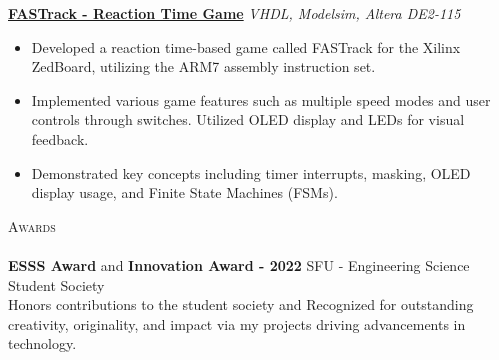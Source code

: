 \documentclass[a4paper]{article}
\newcommand{\lineunder} {
    \vspace*{-8pt} \\
    \hspace*{-18pt} \hrulefill \\
}
\newcommand{\header} [1] {
    {\hspace*{-18pt}\vspace*{6pt} \textsc{#1}}
    \vspace*{-6pt} \lineunder
}
\begin{document}
\href{https://github.com/SatireSage/FASTrack}{\textbf{FASTrack - Reaction Time Game}} {\sl VHDL, Modelsim, Altera DE2-115}
\vspace{-2mm}
\begin{itemize} \itemsep -3pt
    \item Developed a reaction time-based game called FASTrack for the Xilinx ZedBoard, utilizing the ARM7 assembly instruction set.
    \item Implemented various game features such as multiple speed modes and user controls through switches. Utilized OLED display and LEDs for visual feedback.
    \item Demonstrated key concepts including timer interrupts, masking, OLED display usage, and Finite State Machines (FSMs).
\end{itemize}

\header{Awards}
\textbf{ESSS Award} and \textbf{Innovation Award - 2022} \hfill SFU - Engineering Science Student Society\\
Honors contributions to the student society and Recognized for outstanding creativity, originality, and impact via my projects driving advancements in technology.\\
\vspace*{1mm}
\end{document}
